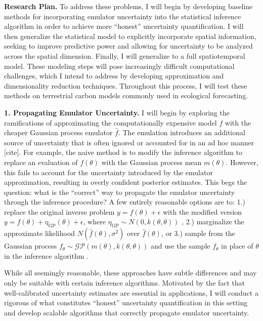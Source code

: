 \documentclass[12pt]{article}
\begin{document}
\noindent
\textbf{Research Plan.} To address these problems, I will begin by developing baseline methods for incorporating emulator uncertainty into the statistical inference algorithm in order to achieve more ``honest''
uncertainty quantification. I will then generalize the statistical model to explicitly incorporate spatial information, seeking to improve predictive power and allowing for uncertainty to be analyzed across
the spatial dimension. Finally, I will generalize to a full spatiotemporal model. These modeling steps will pose increasingly difficult computational challenges, which I intend to address by developing 
approximation and dimensionality reduction techniques. Throughout this process, I will test these methods on terrestrial carbon models commonly used in ecological forecasting. 
 
 \textbf{1. Propagating Emulator Uncertainty.} I will begin by exploring the ramifications of approximating the computationally expensive model $f$ with the  cheaper Gaussian process emulator $\hat{f}$. 
 The emulation introduces an additional source of uncertainty that is often ignored or accounted for in an ad hoc manner [cite]. 
For example, the naive method is to modify the inference algorithm to replace an evaluation of $f(\theta)$ with the Gaussian process mean $m(\theta)$. However, this fails to account
 for the uncertainty introduced by the emulator approximation, resulting in overly confident posterior estimates. This begs the question: what is the ``correct'' way to propagate the emulator uncertainty through 
 the inference procedure? A few entirely reasonable options are to: 1.) replace the original inverse problem $y = f(\theta) + \epsilon$ with the modified version $y = f(\theta) + \eta_{\text{GP}}(\theta) + \epsilon$, 
 where $\eta_{\text{GP}} \sim N(0, k(\theta, \theta))$ \cite{Cleary}, 2.) marginalize the approximate likelihood $N(\hat{f}(\theta), \sigma^2)$ over $\hat{f}(\theta)$, or 3.) sample from the Gaussian process 
 $f_\theta \sim \mathcal{GP}(m(\theta), k(\theta, \theta))$ and use the sample $f_\theta$ in place of $\theta$ in the inference algorithm \cite{Fer}. 
 
While all seemingly reasonable, these approaches have subtle differences and may only be suitable with certain inference algorithms. Motivated by the fact that well-calibrated uncertainty estimates are essential in applications, I will conduct a rigorous of what constitutes ``honest'' uncertainty quantification in this setting and develop scalable algorithms that correctly propagate emulator uncertainty. 
 
\end{document}
